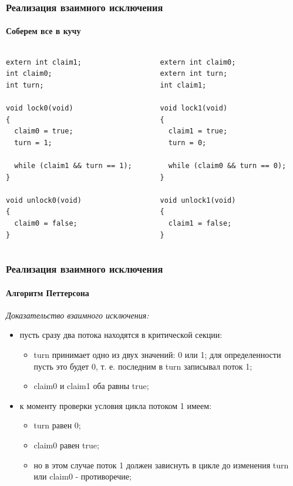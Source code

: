 \begin{frame}[fragile]
\frametitle{Реализация взаимного исключения}
\framesubtitle{Соберем все в кучу}

\begin{columns}[T]
  \begin{column}{.45\linewidth}
    \begin{lstlisting}
extern int claim1;
int claim0;
int turn;

void lock0(void)
{
  claim0 = true;
  turn = 1;

  while (claim1 && turn == 1);
}

void unlock0(void)
{
  claim0 = false;
}
    \end{lstlisting}
  \end{column}
  \begin{column}{.45\linewidth}
    \begin{lstlisting}
extern int claim0;
extern int turn;
int claim1;

void lock1(void)
{
  claim1 = true;
  turn = 0;

  while (claim0 && turn == 0);
}

void unlock1(void)
{
  claim1 = false;
}
    \end{lstlisting}
  \end{column}
\end{columns}
\end{frame}

\begin{frame}
\frametitle{Реализация взаимного исключения}
\framesubtitle{Алгоритм Петтерсона}

\emph{Доказательство взаимного исключения:}
\begin{itemize}
  \item пусть сразу два потока находятся в критической секции:
        \begin{itemize}
          \item turn принимает одно из двух значений: 0 или 1; для
                определенности пусть это будет 0, т. е. последним в turn
                записывал поток 1;
          \item claim0 и claim1 оба равны true;
        \end{itemize}
  \item к моменту проверки условия цикла потоком 1 имеем:
        \begin{itemize}
          \item turn равен 0;
          \item claim0 равен true;
          \item но в этом случае поток 1 должен зависнуть в цикле до изменения
                turn или claim0 - противоречие;
        \end{itemize}
\end{itemize}
\end{frame}

